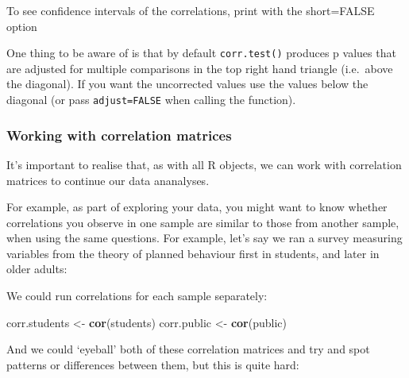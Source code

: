 \documentclass[]{article}
\newenvironment{Shaded}{\begin{snugshade}}{\end{snugshade}}
\newcommand{\KeywordTok}[1]{\textcolor[rgb]{0.13,0.29,0.53}{\textbf{#1}}}
\newcommand{\NormalTok}[1]{#1}
\newcommand{\OperatorTok}[1]{\textcolor[rgb]{0.81,0.36,0.00}{\textbf{#1}}}
\newcommand{\OtherTok}[1]{\textcolor[rgb]{0.56,0.35,0.01}{#1}}
\newcommand{\StringTok}[1]{\textcolor[rgb]{0.31,0.60,0.02}{#1}}
\begin{document}
\begin{Shaded}
\begin{Highlighting}[]
\NormalTok{ To see confidence intervals of the correlations, print with the short=}\OtherTok{FALSE}\NormalTok{ option}
\end{Highlighting}
\end{Shaded}

One thing to be aware of is that by default \texttt{corr.test()} produces p values that
are adjusted for multiple comparisons in the top right hand triangle (i.e.~above
the diagonal). If you want the uncorrected values use the values below the
diagonal (or pass \texttt{adjust=FALSE} when calling the function).

\hypertarget{working-with-correlation-matrices}{%
\subsubsection*{Working with correlation matrices}\label{working-with-correlation-matrices}}

It's important to realise that, as with all R objects, we can work with
correlation matrices to continue our data ananalyses.

For example, as part of exploring your data, you might want to know whether
correlations you observe in one sample are similar to those from another sample,
when using the same questions. For example, let's say we ran a survey measuring
variables from the theory of planned behaviour first in students, and later in
older adults:

We could run correlations for each sample separately:

\begin{Shaded}
\begin{Highlighting}[]
\NormalTok{corr.students <-}\StringTok{ }\KeywordTok{cor}\NormalTok{(students)}
\NormalTok{corr.public <-}\StringTok{ }\KeywordTok{cor}\NormalTok{(public)}
\end{Highlighting}
\end{Shaded}

And we could `eyeball' both of these correlation matrices and try and spot
patterns or differences between them, but this is quite hard:

\begin{Shaded}
\end{Shaded}
\end{document}
